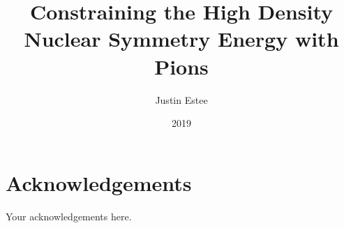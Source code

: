 \documentclass[]{msu-thesis}
\title{Constraining the High Density Nuclear Symmetry Energy with Pions}
\author{Justin Estee}
\date{2019}
\begin{document}

\frontmatter
\maketitlepage
\begin{abstract}
\end{abstract}

\clearpage

\makecopyrightpage

%
%
\clearpage
\chapter*{Acknowledgements}
\DoubleSpacing %
Your acknowledgements here.
%
\clearpage
\SingleSpacing
\tableofcontents* %
\clearpage
\listoftables %
\clearpage
\listoffigures %
%
%
\mainmatter
%

%
%

%
%
%
\end{document}
